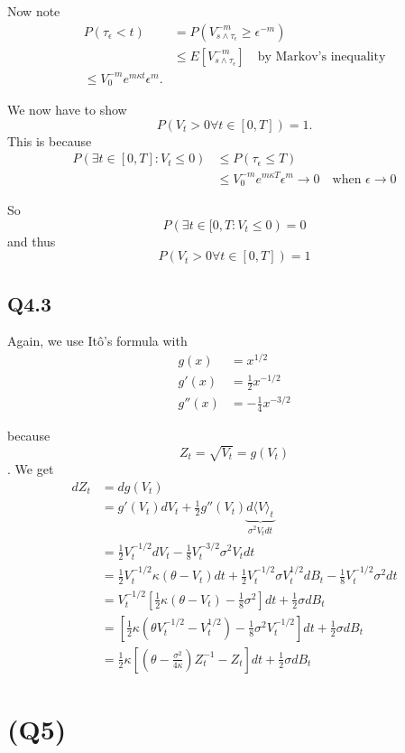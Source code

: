 \documentclass[11pt, a4paper]{article}
\begin{document}
Now note
\begin{align*}
    P(\tau_{\epsilon}<t) 
    &= P(V_{s\wedge\tau_{\epsilon}}^{-m}\ge\epsilon^{-m})\\
    &\le E[V_{s\wedge\tau_{\epsilon}}^{-m}]\quad\text{by Markov's inequality}\\
    \le V_0^{-m}e^{m\kappa t}\epsilon^m.
\end{align*}

We now have to show $$P(V_t>0\forall t\in [0,T])=1.$$
This is because
\begin{align*}
    P(\exists t\in[0,T]: V_t\le 0)
    &\le P(\tau_{\epsilon}\le T)\\
    &\le V_0^{-m}e^{m\kappa T}\epsilon^m \to 0\quad\text{when }\epsilon\to0
\end{align*}

So $$P(\exists t\in[0,T: V_t\le0)=0$$ and thus $$P(V_t>0\forall t\in[0,T])=1$$ 

\subsection*{Q4.3} Again, we use Itô's formula with
\begin{align*}
g(x) &= x^{1/2}\\
g'(x) &= \frac12 x^{-1/2}\\
g''(x) &= -\frac14 x^{-3/2}
\end{align*}

because $$Z_t = \sqrt{V_t} = g(V_t)$$.
We get
\begin{align*}
    dZ_t
    &= dg(V_t)\\
    &= g'(V_t)dV_t +\frac12 g''(V_t)\underbrace{d\langle V \rangle_t}_{\sigma^2 V_t dt}\\
    &= \frac12 V_t^{-1/2}dV_t -\frac18 V_t^{-3/2} \sigma^2 V_t dt\\
    &=\frac12 V_t^{-1/2}\kappa(\theta-V_t)dt +\frac12 V_t^{-1/2}\sigma V_t^{1/2}dB_t -\frac18 V_t^{-1/2}\sigma^2dt\\
    &= V_t^{-1/2}\left[\frac12 \kappa(\theta-V_t)-\frac18\sigma^2\right]dt + \frac12\sigma dB_t\\
    &= \left[\frac12\kappa(\theta V_t^{-1/2}- V_t^{1/2})-\frac18\sigma^2 V_t^{-1/2}\right]dt +\frac12\sigma dB_t\\
    &= \frac12\kappa \left[\left(\theta-\frac{\sigma^2}{4\kappa}\right)Z_t^{-1}-Z_t\right]dt +\frac12 \sigma dB_t
\end{align*}

\section*{(Q5)}
\end{document}
